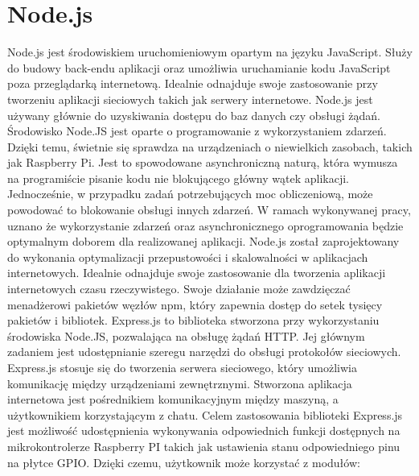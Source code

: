 \section{Node.js}
	Node.js jest środowiskiem uruchomieniowym opartym na języku JavaScript. Służy do budowy back-endu aplikacji oraz umożliwia uruchamianie kodu JavaScript poza przeglądarką internetową. Idealnie odnajduje swoje zastosowanie przy tworzeniu aplikacji sieciowych takich jak serwery internetowe. Node.js jest używany głównie do uzyskiwania dostępu do baz danych czy obsługi żądań. Środowisko Node.JS jest oparte o programowanie z wykorzystaniem zdarzeń. Dzięki temu, świetnie się sprawdza na urządzeniach o niewielkich zasobach, takich jak Raspberry Pi. Jest to spowodowane asynchroniczną naturą, która wymusza na programiście pisanie kodu nie blokującego główny wątek aplikacji. Jednocześnie, w przypadku zadań potrzebujących moc obliczeniową, może powodować to blokowanie obsługi innych zdarzeń. W ramach wykonywanej pracy, uznano że wykorzystanie zdarzeń oraz asynchronicznego oprogramowania będzie optymalnym doborem dla realizowanej aplikacji. Node.js został zaprojektowany do wykonania optymalizacji przepustowości i skalowalności w aplikacjach internetowych. Idealnie odnajduje swoje zastosowanie dla tworzenia aplikacji internetowych czasu rzeczywistego. Swoje działanie może zawdzięczać menadżerowi pakietów węzłów npm, który zapewnia dostęp do setek tysięcy pakietów i bibliotek. Express.js to biblioteka stworzona przy wykorzystaniu środowiska Node.JS, pozwalająca na obsługę żądań HTTP.  Jej głównym zadaniem jest udostępnianie szeregu narzędzi do obsługi protokołów sieciowych. Express.js stosuje się do tworzenia serwera sieciowego, który umożliwia komunikację między urządzeniami zewnętrznymi. Stworzona aplikacja internetowa jest pośrednikiem komunikacyjnym między maszyną, a użytkownikiem korzystającym z chatu. Celem zastosowania biblioteki Express.js jest możliwość udostępnienia wykonywania odpowiednich funkcji dostępnych na mikrokontrolerze Raspberry PI takich jak ustawienia stanu odpowiedniego pinu na płytce GPIO. Dzięki czemu, użytkownik może korzystać z modułów:
